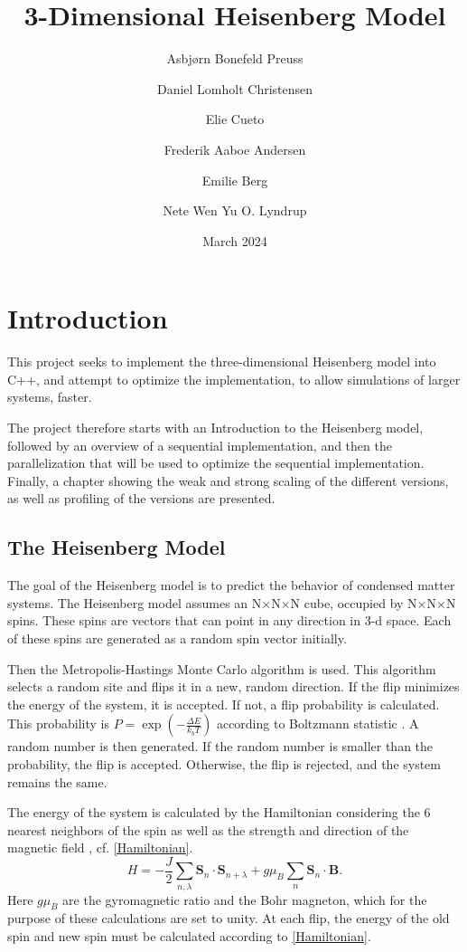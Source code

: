 \documentclass{article}
\title{3-Dimensional Heisenberg Model}
\author{Asbjørn Bonefeld Preuss \and Daniel Lomholt Christensen \and Elie Cueto \and Frederik Aaboe Andersen \and Emilie Berg \and Nete Wen Yu O. Lyndrup}
\date{March 2024}
\renewcommand{\vec}{\mathbf}
\begin{document}
\maketitle
\renewcommand{\thepage}{}
\setcounter{page}{0}
\tableofcontents
\newpage
\renewcommand{\thepage}{\arabic{page}}
\section{Introduction}
This project seeks to implement the three-dimensional Heisenberg model into C++, and attempt to optimize the implementation, to allow simulations of larger systems, faster.

The project therefore starts with an Introduction to the Heisenberg model, followed by an overview of a sequential implementation, and then the parallelization that will be used to optimize the sequential implementation. Finally, a chapter showing the weak and strong scaling of the different versions, as well as profiling of the versions are presented.

\subsection{The Heisenberg Model}
The goal of the Heisenberg model is to predict the behavior of condensed matter systems.
The Heisenberg model assumes an N$\times$N$\times$N cube, occupied by N$\times$N$\times$N spins. These spins are vectors that can point in any direction in 3-d space. Each of these spins are generated as a random spin vector initially. 

Then the Metropolis-Hastings Monte Carlo algorithm is used\autocite{sneppenComplexPhysics2023}. This algorithm selects a random site and flips it in a new, random direction. If the flip minimizes the energy of the system, it is accepted. If not, a flip probability is calculated. This probability is $P=\exp\left(-\frac{\Delta E}{k_bT}\right)$ according to Boltzmann statistic \autocite{simonOxfordSolidState2013}.
A random number is then generated. If the random number is smaller than the probability, the flip is accepted. Otherwise, the flip is rejected, and the system remains the same.

The energy of the system is calculated by the Hamiltonian considering the 6 nearest neighbors of the spin as well as the strength and direction of the magnetic field \cite{simonOxfordSolidState2013}, cf. \cref{Hamiltonian}.
\begin{equation}
    H = - \frac{J}{2}\sum_{n, \lambda}\mathbf{S}_n\cdot\mathbf{S}_{n + \lambda} + g\mu_B\sum_n \vec{S}_n \cdot \vec{B}.
    \label{Hamiltonian}
\end{equation}
Here $g\mu_B$ are the gyromagnetic ratio and the Bohr magneton, which for the purpose of these calculations are set to unity.
At each flip, the energy of the old spin and new spin must be calculated according to \cref{Hamiltonian}. 
\end{document}
